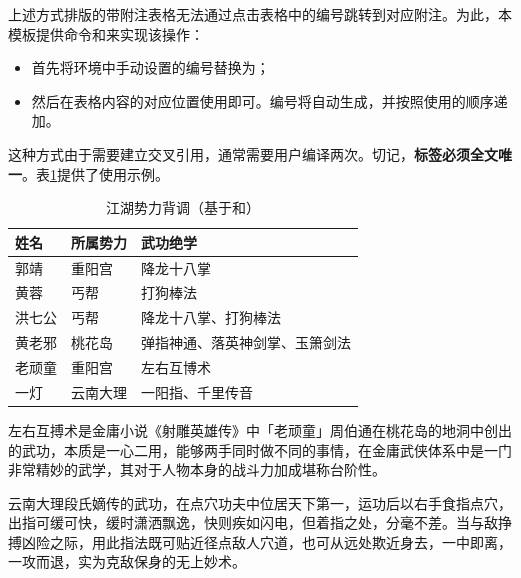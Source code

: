 \documentclass[QingNianC, vlined, timesmathnogreek]{nsfc}
\begin{document}
	上述方式排版的带附注表格无法通过点击表格中的编号跳转到对应附注。为此，本模板提供命令和来实现该操作：

	\begin{itemize}
		\item 首先将环境中手动设置的编号替换为；
		\item 然后在表格内容的对应位置使用即可。编号将自动生成，并按照使用的顺序递加。
	\end{itemize}

	这种方式由于需要建立交叉引用，通常需要用户编译两次。切记，\textbf{标签必须全文唯一}。表\ref{tab: 江湖势力背调（基于puttablenotelabel和tablenoteref）}提供了使用示例。

	\begin{table}[!ht]
		\caption{江湖势力背调（基于和）} \label{tab: 江湖势力背调（基于puttablenotelabel和tablenoteref）}
		\begin{threeparttable}
			\begin{tabular}{p{2cm} p{3cm} p{7cm}}
				\toprule
				\textbf{姓名} & \textbf{所属势力} & \textbf{武功绝学} \\
				\midrule
				郭靖 & 重阳宫 & 降龙十八掌 \\
				黄蓉 & 丐帮 & 打狗棒法 \\
				洪七公 & 丐帮 & 降龙十八掌、打狗棒法 \\
				黄老邪 & 桃花岛 & 弹指神通、落英神剑掌、玉箫剑法 \\
				老顽童 & 重阳宫 & 左右互博术\tablenoteref{tn: 左右互搏术} \\
				一灯 & 云南大理 & 一阳指\tablenoteref{tn: 一阳指}、千里传音 \\
				\bottomrule
			\end{tabular}
			\begin{tablenotes}
				\item[\puttablenotelabel{tn: 左右互搏术}] 左右互搏术是金庸小说《射雕英雄传》中「老顽童」周伯通在桃花岛的地洞中创出的武功，本质是一心二用，能够两手同时做不同的事情，在金庸武侠体系中是一门非常精妙的武学，其对于人物本身的战斗力加成堪称台阶性。
				\item[\puttablenotelabel{tn: 一阳指}] 云南大理段氏嫡传的武功，在点穴功夫中位居天下第一，运功后以右手食指点穴，出指可缓可快，缓时潇洒飘逸，快则疾如闪电，但着指之处，分毫不差。当与敌挣搏凶险之际，用此指法既可贴近径点敌人穴道，也可从远处欺近身去，一中即离，一攻而退，实为克敌保身的无上妙术。
			\end{tablenotes}
		\end{threeparttable}
	\end{table}
	
\end{document}
